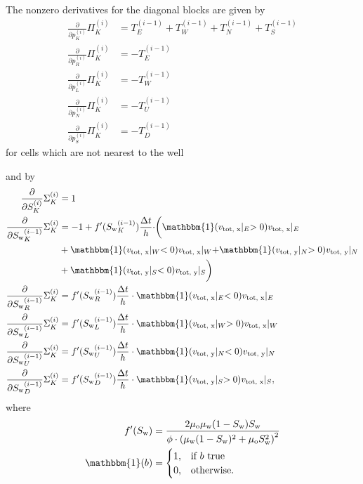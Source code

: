 \documentclass[conference]{IEEEtran}
\newcommand*{\indicator}{\ensuremath{\mathbb{1}}}
\newcommand*{\pdiff}[2]{\ensuremath{\frac{\partial}{\partial{#2}}{#1}}}
\renewcommand*{\indicator}{\ensuremath{\mathbbm{1}}}
\begin{document}
The nonzero derivatives for the diagonal blocks are given by
\begin{align}
\pdiff{\Pi_K^{(i)}}{p_K^{(i)}} &= T_E^{(i-1)} + T_W^{(i-1)} + T_N^{(i-1)} + T_S^{(i-1)} \\
\pdiff{\Pi_K^{(i)}}{p_R^{(i)}} &= -T_E^{(i-1)} \\
\pdiff{\Pi_K^{(i)}}{p_L^{(i)}} &= -T_W^{(i-1)} \\
\pdiff{\Pi_K^{(i)}}{p_N^{(i)}} &= -T_U^{(i-1)} \\
\pdiff{\Pi_K^{(i)}}{p_S^{(i)}} &= -T_D^{(i-1)}
\end{align}
for cells which are not nearest to the well

and by
\begin{align}
\pdiff{\Sigma_K^{(i)}}{S_K^{(i)}} &= 1 \\
\pdiff{\Sigma_K^{(i)}}{{S_{\text{w}}}_K^{(i-1)}} &=  -1 + f^\prime({S_{\text{w}}}_K^{(i-1)}) \frac{\Delta t}{h}\cdot \biggr(\indicator(v_\text{tot, x}\lvert_E > 0) v_\text{tot, x}\lvert_E \\&+ \indicator(v_\text{tot, x}\lvert_W < 0) v_\text{tot, x}\lvert_W + \indicator(v_\text{tot, y}\lvert_N > 0) v_\text{tot, y}\lvert_N  \nonumber\\&+ \indicator(v_\text{tot, y}\lvert_S < 0) v_\text{tot, y}\lvert_S\biggr) \nonumber\\ 
\pdiff{\Sigma_K^{(i)}}{{S_{\text{w}}}_R^{(i-1)}} &= f^\prime({S_{\text{w}}}_R^{(i-1)}) \frac{\Delta t}{h}\cdot \indicator(v_\text{tot, x}\lvert_E < 0) v_\text{tot, x}\lvert_E \\
\pdiff{\Sigma_K^{(i)}}{{S_{\text{w}}}_L^{(i-1)}} &= f^\prime({S_{\text{w}}}_L^{(i-1)}) \frac{\Delta t}{h}\cdot \indicator(v_\text{tot, x}\lvert_W > 0) v_\text{tot, x}\lvert_W \\
\pdiff{\Sigma_K^{(i)}}{{S_{\text{w}}}_U^{(i-1)}} &= f^\prime({S_{\text{w}}}_U^{(i-1)}) \frac{\Delta t}{h}\cdot \indicator(v_\text{tot, y}\lvert_N < 0) v_\text{tot, y}\lvert_N \\
\pdiff{\Sigma_K^{(i)}}{{S_{\text{w}}}_D^{(i-1)}} &= f^\prime({S_{\text{w}}}_D^{(i-1)}) \frac{\Delta t}{h}\cdot \indicator(v_\text{tot, y}\lvert_S > 0) v_\text{tot, x}\lvert_S,
\end{align}
where
\begin{align}
f^\prime(S_\text{w}) &=  \frac{2\mu_\text{o}\mu_\text{w} (1 - S_\text{w})S_\text{w}}{\phi \cdot \left(\mu_\text{w}(1 - S_\text{w})^2 + \mu_\text{o}S_\text{w}^2\right)^2}\\
\indicator(b) &= \begin{cases} 1, &\text{if } b \text{ true} \\ 0, &\text{otherwise.}
\end{cases}
\end{align}
\end{document}
